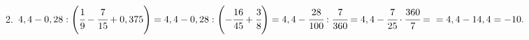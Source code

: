 2. $4,4-0,28:\left(\cfrac{1}{9}-\cfrac{7}{15}+0,375\right)=4,4-0,28:\left(-\cfrac{16}{45}+\cfrac{3}{8}\right)=4,4-\cfrac{28}{100}:\cfrac{7}{360}=4,4-\cfrac{7}{25}\cdot\cfrac{360}{7}=
\\=4,4-14,4=-10.$\\

